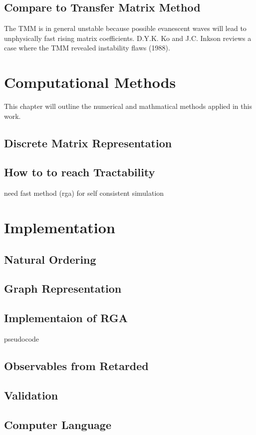   \subsection{Compare to Transfer Matrix Method}
  The TMM is in general unstable because possible evanescent waves will lead to unphysically fast rising matrix coefficients.
  D.Y.K. Ko and J.C. Inkson reviews a case where the TMM revealed instability flaws (1988).
\clearpage
\section{Computational Methods}
This chapter will outline the numerical and mathmatical methods applied in this work.
  \subsection{Discrete Matrix Representation}
  
  \subsection{How to to reach Tractability}
  
  need fast method (rga) for self consistent simulation
\section{Implementation}
\subsection{Natural Ordering}
\subsection{Graph Representation}
\subsection{Implementaion of RGA}
pseudocode
\subsection{Observables from Retarded \gfnc}
\subsection{Validation}
\subsection{Computer Language}
